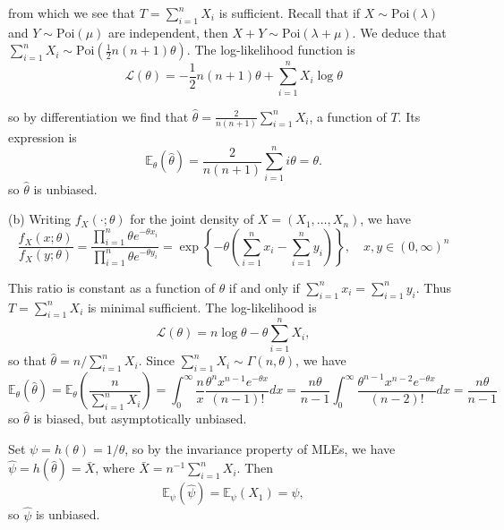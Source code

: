 from which we see that $T=\sum^n_{i=1}X_i$ is sufficient. Recall that if $X\sim\text{Poi}(\lambda)$ and $Y\sim\text{Poi}(\mu)$ are independent, then $X+Y\sim\text{Poi}(\lambda+\mu)$. We deduce that $\sum^n_{i=1}X_i\sim\text{Poi}\left(\frac 12n(n+1)\theta\right)$. The log-likelihood function is
\begin{equation}
\mathcal{L}(\theta) = -\frac 12 n(n+1)\theta + \sum^n_{i=1}X_i\log\theta
\end{equation}

so by differentiation we find that $\hat{\theta} = \frac{2}{n(n+1)}\sum^n_{i=1}X_i$, a function of $T$. Its expression is
\begin{equation}
\mathbb{E}_\theta(\hat{\theta}) = \frac{2}{n(n+1)}\sum^n_{i=1}i\theta=\theta.
\end{equation}
so $\hat{\theta}$ is unbiased.

(b) Writing $f_X(\cdot;\theta)$ for the joint density of $X=(X_1,\dots,X_n)$, we have
\begin{equation}
\frac{f_X(x;\theta)}{f_X(y;\theta)}=\frac{\prod^n_{i=1}\theta e^{-\theta x_i}}{\prod^n_{i=1}\theta e^{-\theta y_i}} = \exp\left\{-\theta\left(\sum^n_{i=1}x_i-\sum^n_{i=1}y_i\right)\right\}, \quad x,y\in(0,\infty)^n
\end{equation}

This ratio is constant as a function of $\theta$ if and only if $\sum^n_{i=1}x_i=\sum^n_{i=1}y_i$. Thus $T=\sum^n_{i=1}X_i$ is minimal sufficient. The log-likelihood is
\begin{equation}
\mathcal{L}(\theta) = n\log\theta - \theta\sum^n_{i=1}X_i,
\end{equation}
so that $\hat{\theta}=n/\sum^n_{i=1}X_i$. Since $\sum^n_{i=1}X_i\sim\Gamma(n,\theta)$, we have
\begin{equation}
\mathbb{E}_\theta(\hat{\theta}) = \mathbb{E}_\theta\left(\frac{n}{\sum^n_{i=1}X_i}\right) = \int^\infty_0\frac{n}{x}\frac{\theta^nx^{n-1}e^{-\theta x}}{(n-1)!}dx = \frac{n\theta}{n-1}\int^\infty_0\frac{\theta^{n-1}x^{n-2}e^{-\theta x}}{(n-2)!}dx = \frac{n\theta}{n-1}
\end{equation}
so $\hat{\theta}$ is biased, but asymptotically unbiased.

Set $\psi=h(\theta)=1/\theta$, so by the invariance property of MLEs, we have $\hat{\psi}=h(\hat{\theta})=\bar{X}$, where $\bar{X}=n^{-1}\sum^n_{i=1}X_i$. Then
\begin{equation}
\mathbb{E}_\psi(\hat{\psi}) = \mathbb{E}_\psi(X_1) = \psi,
\end{equation}
so $\hat{\psi}$ is unbiased.





